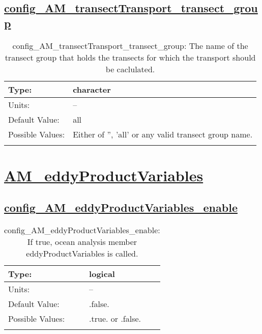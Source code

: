 \subsection[config\_AM\_transectTransport\_transect\_group]{\hyperref[sec:nm_tab_AM_transectTransport]{config\_AM\_transectTransport\_transect\_group}}
\label{subsec:nm_sec_config_AM_transectTransport_transect_group}
\begin{center}
\begin{longtable}{| p{2.0in} || p{4.0in} |}
    \hline
    Type: & character \\
    \hline
    Units: & -- \\
    \hline
    Default Value: & all \\
    \hline
    Possible Values: & Either of '', 'all' or any valid transect group name. \\
    \hline
    \caption{config\_AM\_transectTransport\_transect\_group: The name of the transect group that holds the transects for which the transport should be caclulated.}
\end{longtable}
\end{center}
\section[AM\_eddyProductVariables]{\hyperref[sec:nm_tab_AM_eddyProductVariables]{AM\_eddyProductVariables}}
\label{sec:nm_sec_AM_eddyProductVariables}
\subsection[config\_AM\_eddyProductVariables\_enable]{\hyperref[sec:nm_tab_AM_eddyProductVariables]{config\_AM\_eddyProductVariables\_enable}}
\label{subsec:nm_sec_config_AM_eddyProductVariables_enable}
\begin{center}
\begin{longtable}{| p{2.0in} || p{4.0in} |}
    \hline
    Type: & logical \\
    \hline
    Units: & -- \\
    \hline
    Default Value: & .false. \\
    \hline
    Possible Values: & .true. or .false. \\
    \hline
    \caption{config\_AM\_eddyProductVariables\_enable: If true, ocean analysis member eddyProductVariables is called.}
\end{longtable}
\end{center}

